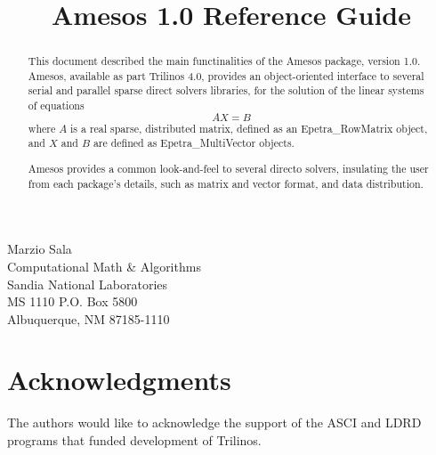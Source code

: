 \documentclass[11pt]{SANDreport}
\title{Amesos 1.0 Reference Guide}
\begin{document}
\maketitle

\begin{center}
Marzio  Sala \\
Computational Math \& Algorithms \\
Sandia National Laboratories\\
MS 1110 P.O. Box 5800 \\
Albuquerque, NM 87185-1110
\end{center}

\vspace{20pt}

\begin{abstract}
  
  This document described the main functinalities of the Amesos package,
  version 1.0. Amesos, available as part Trilinos 4.0, provides an
  object-oriented interface to several serial and parallel sparse direct
  solvers libraries, for the solution of the linear systems of equations
  \begin{equation}
    \label{eq:linear_system}
    A X = B
  \end{equation}
  where $A$ is a real sparse, distributed matrix, defined as an
  Epetra\_RowMatrix object, and $X$ and $B$ are defined as
  Epetra\_MultiVector objects.
  
  Amesos provides a common look-and-feel to several directo solvers,
  insulating the user from each package's details, such as matrix and
  vector format, and data distribution.
\end{abstract}

\clearpage

\SANDmain

\tableofcontents

\clearpage

\section*{Acknowledgments}
The authors would like to acknowledge the support of the ASCI and LDRD programs
that funded development of Trilinos.

\smallskip

\end{document}
